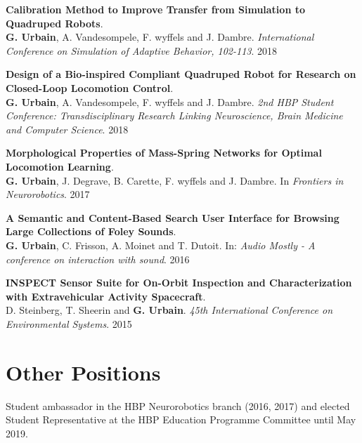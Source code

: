 \documentclass[a4paper]{deedy-resume} %
\begin{document}
{\vspace{5pt}
\textbf{Calibration Method to Improve Transfer from Simulation to Quadruped Robots}. \\
\textbf{G. Urbain}, A. Vandesompele, F. wyffels and J. Dambre.
\textit{International Conference on Simulation of Adaptive Behavior, 102-113}. 2018

\vspace{5pt}
\textbf{Design of a Bio-inspired Compliant Quadruped Robot for Research on Closed-Loop Locomotion Control}.\\
\textbf{G. Urbain}, A. Vandesompele, F. wyffels and J. Dambre.
\textit{2nd HBP Student Conference: Transdisciplinary Research Linking Neuroscience, Brain Medicine and Computer Science}. 2018

\vspace{5pt}
\textbf{Morphological Properties of Mass-Spring Networks for Optimal Locomotion Learning}. \\
\textbf{G. Urbain}, J. Degrave, B. Carette, F. wyffels and J. Dambre. In \textit{Frontiers in Neurorobotics}. 2017

\vspace{5pt}
\textbf{A Semantic and Content-Based Search User Interface for Browsing Large Collections of Foley Sounds}. \\
\textbf{G. Urbain}, C. Frisson, A. Moinet and T. Dutoit. In: \textit{Audio Mostly - A conference on interaction with sound}. 2016

\vspace{5pt}
\textbf{INSPECT Sensor Suite for On-Orbit Inspection and Characterization with Extravehicular Activity Spacecraft}.\\
D. Steinberg, T. Sheerin and \textbf{G. Urbain}.
\textit{45th International Conference on Environmental Systems}. 2015

\vspace{15pt}


\section{Other Positions}
\vspace{5pt}
\begin{minipage}[b]{0.71\linewidth}
	Student ambassador in the HBP Neurorobotics branch (2016, 2017) and elected Student Representative at the HBP Education Programme Committee until May 2019.
	

\end{minipage}}
\end{document}
